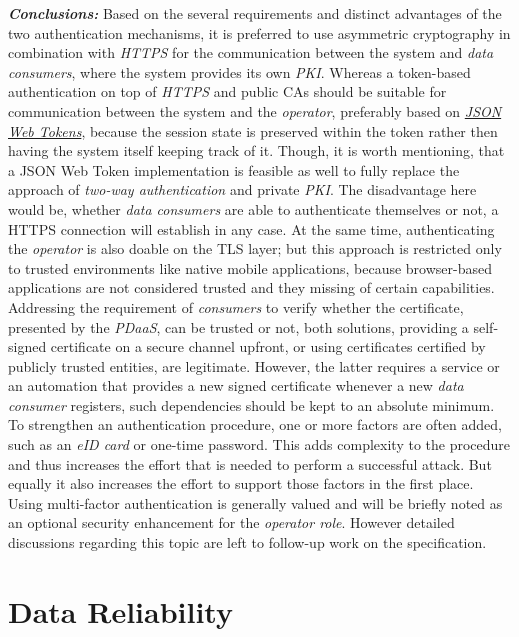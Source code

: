 \documentclass[12pt,english,a4paper,titlepage,cleardoublepage=empty,dottedtoc]{report}
\begin{document}
\emph{\textbf{Conclusions:}} Based on the several requirements and
distinct advantages of the two authentication mechanisms, it is
preferred to use asymmetric cryptography in combination with
\emph{HTTPS} for the communication between the system and \emph{data
consumers}, where the system provides its own \emph{PKI}. Whereas a
token-based authentication on top of \emph{HTTPS} and public CAs should
be suitable for communication between the system and the
\emph{operator}, preferably based on
\emph{\protect\hyperlink{def--jwt}{JSON Web Tokens}}, because the
session state is preserved within the token rather then having the
system itself keeping track of it. Though, it is worth mentioning, that
a JSON Web Token implementation is feasible as well to fully replace the
approach of \emph{two-way authentication} and private \emph{PKI}. The
disadvantage here would be, whether \emph{data consumers} are able to
authenticate themselves or not, a HTTPS connection will establish in any
case. At the same time, authenticating the \emph{operator} is also
doable on the TLS layer; but this approach is restricted only to trusted
environments like native mobile applications, because browser-based
applications are not considered trusted and they missing of certain
capabilities. Addressing the requirement of \emph{consumers} to verify
whether the certificate, presented by the \emph{PDaaS}, can be trusted
or not, both solutions, providing a self-signed certificate on a secure
channel upfront, or using certificates certified by publicly trusted
entities, are legitimate. However, the latter requires a service or an
automation that provides a new signed certificate whenever a new
\emph{data consumer} registers, such dependencies should be kept to an
absolute minimum. To strengthen an authentication procedure, one or more
factors are often added, such as an \emph{eID card} or one-time
password. This adds complexity to the procedure and thus increases the
effort that is needed to perform a successful attack. But equally it
also increases the effort to support those factors in the first place.
Using multi-factor authentication is generally valued and will be
briefly noted as an optional security enhancement for the \emph{operator
role}. However detailed discussions regarding this topic are left to
follow-up work on the specification.

\hypertarget{data-reliability}{\section{Data
Reliability}\label{data-reliability}}
\end{document}
